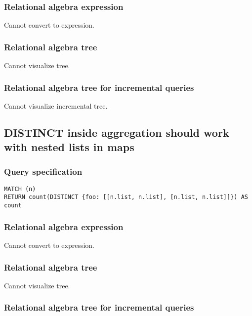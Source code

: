 \subsubsection*{Relational algebra expression}

Cannot convert to expression.

\subsubsection*{Relational algebra tree}

Cannot visualize tree.

\subsubsection*{Relational algebra tree for incremental queries}

Cannot visualize incremental tree.

\subsection{DISTINCT inside aggregation should work with nested lists in maps}

\subsubsection*{Query specification}

\begin{lstlisting}
MATCH (n)
RETURN count(DISTINCT {foo: [[n.list, n.list], [n.list, n.list]]}) AS count
\end{lstlisting}

\subsubsection*{Relational algebra expression}

Cannot convert to expression.

\subsubsection*{Relational algebra tree}

Cannot visualize tree.

\subsubsection*{Relational algebra tree for incremental queries}

